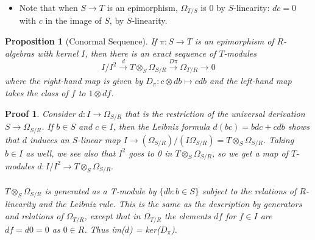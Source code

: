 \documentclass{beamer}
\newtheorem{prop}{Proposition}
\newtheorem{prf}{Proof}
\begin{document}



\begin{frame}
\begin{footnotesize}


\begin{itemize}
\item Note that when $S\to T$ is an epimorphism, $\Omega_{T/S}$ is 0 by $S$-linearity: $dc = 0$ with $c$ in the image of $S$, by $S$-linearity. 
\end{itemize}


\begin{prop}[Conormal Sequence]
If $\pi:S\to T$ is an epimorphism of $R$-algebras with kernel $I$, then there is an exact sequence of $T$-modules
$$I/I^2\xrightarrow[\text{}]{d}T\otimes_S\Omega_{S/R}\xrightarrow[\text{}]{D\pi}\Omega_{T/R}\xrightarrow{}{} 0$$
where the right-hand map is given by $D_{\pi}:c\otimes db\mapsto cdb$ and the left-hand map takes the class of $f$ to $1\otimes df$.
\end{prop}

\begin{prf}
Consider $d:I\to\Omega_{S/R}$ that is the restriction of the universal derivation $S\to\Omega_{S/R}$. If $b\in S$ and $c\in I$, then the Leibniz formula $d(bc) = bdc+cdb$ shows that $d$ induces an $S$-linear map $I\to (\Omega_{S/R})/(I\Omega_{S/R}) = T\otimes_S\Omega_{S/R}$. Taking $b\in I$ as well, we see also that $I^2$ goes to 0 in $T\otimes_S\Omega_{S/R}$, so we get a map of $T$-modules $d:I/I^2\to T\otimes_S\Omega_{S/R}.$
\\\indent 
\\$T\otimes_S\Omega_{S/R}$ is generated as a T-module by $\{db:b\in S\}$ subject to the relations of $R$-linearity and the Leibniz rule. This is the same as the description by generators and relations of $\Omega_{T/R}$, except that in $\Omega_{T/R}$ the elements $df$ for $f\in I$ are $df = d0 = 0$ as $0\in R$. Thus im($d$) = ker($D_\pi$).
\end{prf}


\end{footnotesize}
\end{frame}







\end{document}
